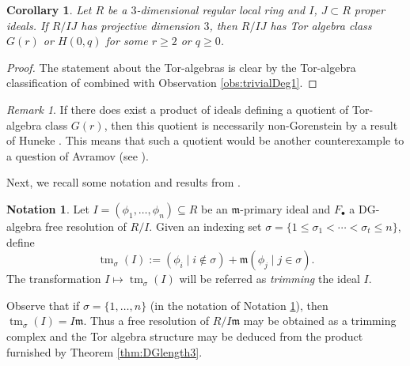 \documentclass[10pt]{amsart}
\newtheorem{cor}[theorem]{Corollary}
\theoremstyle{definition}
\newtheorem{notation}[theorem]{Notation}
\theoremstyle{remark}
\newtheorem{remark}[theorem]{Remark}
\newtheorem{the context}[theorem]{The Context}
\numberwithin{equation}{theorem}
\numberwithin{equation}{section}
\newcommand{\ideal}[1]{\mathfrak{#1}}
\newcommand{\m}{\ideal{m}}
\renewcommand{\geq}{\geqslant}
\renewcommand{\leq}{\leqslant}
\newcommand{\tm}{\operatorname{tm}}
\begin{document}
\begin{cor}\label{cor:torAlgProd}
Let $R$ be a $3$-dimensional regular local ring and $I$, $J \subset R$ proper ideals. If $R/IJ$ has projective dimension $3$, then $R/IJ$ has Tor algebra class $G(r)$ or $H (0,q)$ for some $r \geq 2$ or $q \geq 0$.
\end{cor}

\begin{proof}
The statement about the Tor-algebras is clear by the Tor-algebra classification of \cite[Theorem 2.1]{avramov1988poincare} combined with Observation \ref{obs:trivialDeg1}.
\end{proof}

\begin{remark}
If there does exist a product of ideals defining a quotient of Tor-algebra class $G(r)$, then this quotient is necessarily non-Gorenstein by a result of Huneke \cite{huneke2007ideals}. This means that such a quotient would be another counterexample to a question of Avramov (see \cite{avramov2012cohomological}).
\end{remark}

Next, we recall some notation and results from \cite{vandebogert2020dg}.

\begin{notation}\label{not:trimmingNotation}
Let $I = (\phi_1 , \dots  , \phi_n) \subseteq R$ be an $\m$-primary ideal and $F_\bullet$ a DG-algebra free resolution of $R/I$. Given an indexing set $\sigma = \{1 \leq \sigma_1 < \cdots < \sigma_t \leq n\}$, define
$$\tm_\sigma (I) := (\phi_i \mid i \notin \sigma) + \m (\phi_j \mid j \in \sigma).$$
The transformation $I \mapsto \tm_\sigma (I)$ will be referred as \emph{trimming} the ideal $I$.
\end{notation}

Observe that if $\sigma = \{ 1 , \dots , n \}$ (in the notation of Notation \ref{not:trimmingNotation}), then $\tm_\sigma (I) = I \m$. Thus a free resolution of $R / I \m$ may be obtained as a trimming complex and the Tor algebra structure may be deduced from the product furnished by Theorem \ref{thm:DGlength3}.
\end{document}
